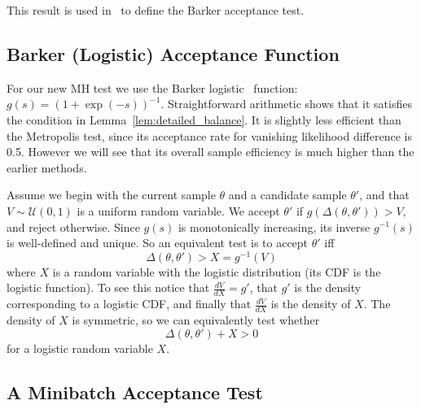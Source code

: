 \documentclass{article}
\begin{document}
This result is used in~\cite{Barker65} to define the Barker acceptance test.

\subsection{Barker (Logistic) Acceptance Function}\label{ssec:barker_function}
For our new MH test we use the Barker logistic~\cite{Barker65}
function: $g(s)=(1+\exp(-s))^{-1}$. Straightforward arithmetic shows
that it satisfies the condition in Lemma~\ref{lem:detailed_balance}.
It is slightly less efficient than the Metropolis test, since its
acceptance rate for vanishing likelihood difference is 0.5. However we
will see that its overall sample efficiency is much higher than the
earlier methods.

Assume we begin with the current sample $\theta$ and a candidate sample
$\theta'$, and that $V \sim \mathcal{U}(0,1)$ is a uniform random variable. We
accept $\theta'$ if $g(\Delta(\theta,\theta')) > V$, and reject otherwise.
Since $g(s)$ is monotonically increasing, its inverse $g^{-1}(s)$ is
well-defined and unique. So an equivalent test is to accept $\theta'$ iff
\begin{equation}\label{eq:equivalent_test}
    \Delta(\theta,\theta') > X = g^{-1}(V)
\end{equation}
where $X$ is a random variable with the logistic distribution (its CDF is the
logistic function). To see this notice that $\frac{dV}{dX} = g'$, that $g'$ is
the density corresponding to a logistic CDF, and finally that $\frac{dV}{dX}$ is
the density of $X$. The density of $X$ is symmetric, so we can equivalently test
whether
\begin{equation}\label{eq:the_exact_test}
    \Delta(\theta,\theta') + X > 0
\end{equation}
for a logistic random variable $X$.


\subsection{A Minibatch Acceptance Test}\label{ssec:deltas_minibatch}
\end{document}
